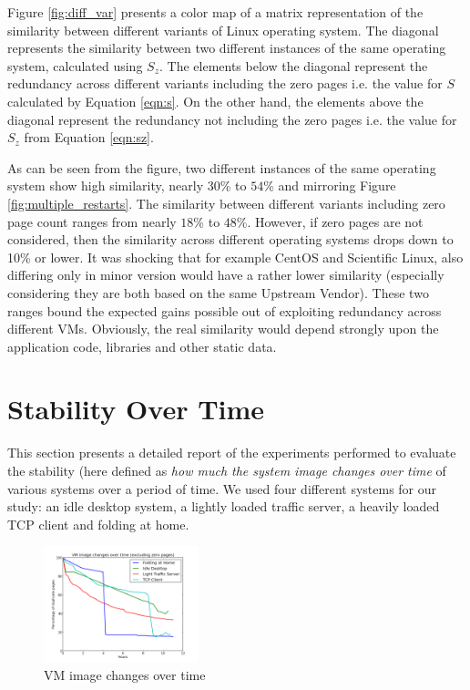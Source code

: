 \documentclass{acm_proc_article-sp}
\begin{document}
Figure \ref{fig:diff_var} presents a color map of a matrix representation of the similarity between different variants of Linux operating system. The diagonal represents the similarity between two different instances of the same operating system, calculated using $S_z$. The elements below the diagonal represent the redundancy across different variants including the zero pages i.e. the value for $S$ calculated by Equation \ref{eqn:s}. On the other hand, the elements above the diagonal represent the redundancy not including the zero pages i.e. the value for $S_z$ from Equation \ref{eqn:sz}.

As can be seen from the figure, two different instances of the same operating system show high similarity, nearly $30$\% to $54$\% and mirroring Figure \ref{fig:multiple_restarts}. The similarity between different variants including zero page count ranges from nearly $18$\% to $48$\%. However, if zero pages are not considered, then the similarity across different operating systems drops down to 10\% or lower.  It was shocking that for example CentOS and Scientific Linux, also differing only in minor version would have a rather lower similarity (especially considering they are both based on the same Upstream Vendor).  These two ranges bound the expected gains possible out of exploiting redundancy across different VMs.  Obviously, the real similarity would depend strongly upon the application code, libraries and other static data. 

\section{Stability Over Time}
This section presents a detailed report of the experiments performed to evaluate the stability (here defined as \textit{how much the system image changes over time} of various systems over a period of time. We used four different systems for our study: an idle desktop system, a lightly loaded traffic server, a heavily loaded TCP client and folding at home.


\begin{figure}
  \centering
  \includegraphics[width=0.4\textwidth]{images/vm_vs_time.png}
  \caption{VM image changes over time}\label{fig:vm_vs_time}
\end{figure}
\end{document}
